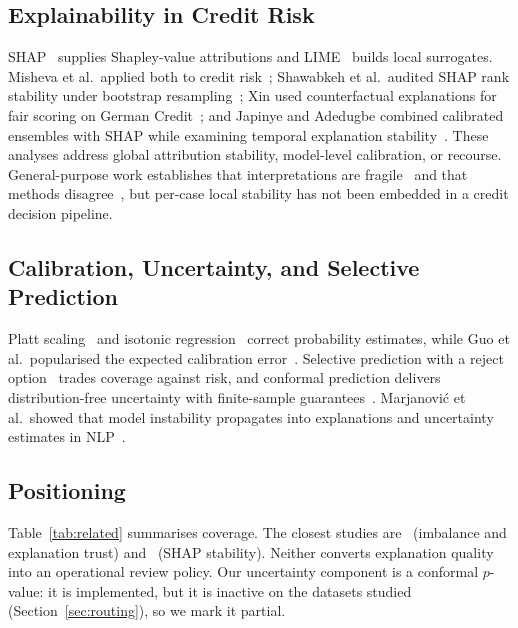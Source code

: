 \documentclass[journal]{IEEEtran}
\begin{document}
\subsection{Explainability in Credit Risk}
SHAP~\cite{lundberg2017unified} supplies Shapley-value attributions and
LIME~\cite{ribeiro2016why} builds local surrogates. Misheva et al.\ applied
both to credit risk~\cite{misheva2021explainable}; Shawabkeh et al.\ audited
SHAP rank stability under bootstrap resampling~\cite{shawabkeh2026explainable};
Xin used counterfactual explanations for fair scoring on German
Credit~\cite{xin2026explainable}; and Japinye and Adedugbe combined calibrated
ensembles with SHAP while examining temporal explanation
stability~\cite{japinye2025explainable}. These analyses address global
attribution stability, model-level calibration, or recourse. General-purpose
work establishes that interpretations are fragile~\cite{alvarezmelis2018robustness,
ghorbani2019interpretation} and that methods disagree~\cite{krishna2022disagreement},
but per-case local stability has not been embedded in a credit decision pipeline.

\subsection{Calibration, Uncertainty, and Selective Prediction}
Platt scaling~\cite{platt1999probabilistic} and isotonic
regression~\cite{zadrozny2002transforming,niculescu2005predicting} correct
probability estimates, while Guo et al.\ popularised the expected calibration
error~\cite{guo2017calibration}. Selective prediction with a reject
option~\cite{geifman2017selective} trades coverage against risk, and conformal
prediction delivers distribution-free uncertainty with finite-sample
guarantees~\cite{angelopoulos2023conformal,vovk2005algorithmic}. Marjanovi\'c
et al.\ showed that model instability propagates into explanations and
uncertainty estimates in NLP~\cite{marjanovic2024investigating}.

\subsection{Positioning}
Table~\ref{tab:related} summarises coverage. The closest studies are~\cite{tufail2026signal}
(imbalance and explanation trust) and~\cite{shawabkeh2026explainable} (SHAP
stability). Neither converts explanation quality into an operational review
policy. Our uncertainty component is a conformal $p$-value: it is implemented,
but it is inactive on the datasets studied (Section~\ref{sec:routing}), so we
mark it partial.
\end{document}
